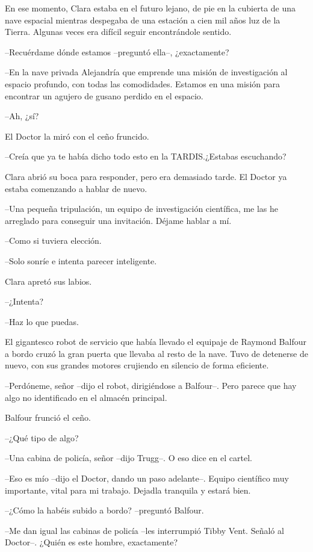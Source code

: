 {En ese momento, Clara estaba en el futuro lejano, de pie en la cubierta
 de una nave espacial mientras despegaba de una estación a cien mil años
 luz de la Tierra. Algunas veces era difícil seguir encontrándole
sentido.}

{--Recuérdame dónde estamos --preguntó ella--, ¿exactamente?}

{--En la nave privada Alejandría que emprende una misión de investigación
 al espacio profundo, con todas las comodidades. Estamos en una misión
para encontrar un agujero de gusano perdido en el espacio.}

{--Ah, ¿sí?}

{El Doctor la miró con el ceño fruncido.}

{--Creía que ya te había dicho todo esto en la TARDIS.\@ ¿Estabas
escuchando?}

{Clara abrió su boca para responder, pero era demasiado tarde. El Doctor
ya estaba comenzando a hablar de nuevo.}

{--Una pequeña tripulación, un equipo de investigación científica, me las
he arreglado para conseguir una invitación. Déjame hablar a mí.}

{--Como si tuviera elección.}

{--Solo sonríe e intenta parecer inteligente.}

{Clara apretó sus labios.}

{--¿Intenta?}

{--Haz lo que puedas.}

{El gigantesco robot de servicio que había llevado el equipaje de Raymond
 Balfour a bordo cruzó la gran puerta que llevaba al resto de la nave.
 Tuvo de detenerse de nuevo, con sus grandes motores crujiendo en
silencio de forma eficiente.}

{--Perdóneme, señor --dijo el robot, dirigiéndose a Balfour--. Pero
parece que hay algo no identificado en el almacén principal.}

{Balfour frunció el ceño.}

{--¿Qué tipo de algo?}

{--Una cabina de policía, señor --dijo Trugg--. O eso dice en el
cartel.}

{--Eso es mío --dijo el Doctor, dando un paso adelante--. Equipo
 científico muy importante, vital para mi trabajo. Dejadla tranquila y
estará bien.}

{--¿Cómo la habéis subido a bordo? --preguntó Balfour.}

{--Me dan igual las cabinas de policía --les interrumpió Tibby Vent.
Señaló al Doctor--. ¿Quién es este hombre, exactamente?}

